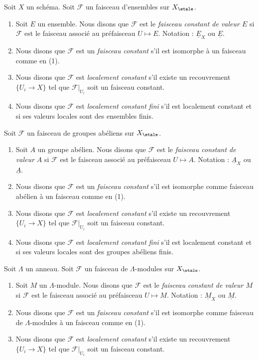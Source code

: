 \begin{definition}
\label{definition-finite-locally-constant}
Soit $X$ un sch\'ema.
Soit $\mathcal{F}$ un faisceau d'ensembles sur $X_\etale$.
\begin{enumerate}
\item Soit $E$ un ensemble. Nous disons que $\mathcal{F}$ est le
{\it faisceau constant de valeur $E$} si $\mathcal{F}$ est le
faisceau associ\'e au pr\'efaisceau $U \mapsto E$.
Notation : $\underline{E}_X$ ou $\underline{E}$.
\item Nous disons que $\mathcal{F}$ est un {\it faisceau constant} s'il est
isomorphe \`a un faisceau comme en (1).
\item Nous disons que $\mathcal{F}$ est {\it localement constant} s'il existe un
recouvrement $\{U_i \to X\}$ tel que $\mathcal{F}|_{U_i}$ soit un faisceau constant.
\item Nous disons que $\mathcal{F}$ est {\it localement constant fini} s'il
est localement constant et si ses valeurs locales sont des ensembles finis.
\end{enumerate}
Soit $\mathcal{F}$ un faisceau de groupes ab\'eliens sur $X_\etale$.
\begin{enumerate}
\item Soit $A$ un groupe ab\'elien.
Nous disons que $\mathcal{F}$ est le {\it faisceau constant de valeur $A$} si
$\mathcal{F}$ est le faisceau associ\'e au pr\'efaisceau $U \mapsto A$.
Notation : $\underline{A}_X$ ou $\underline{A}$.
\item Nous disons que $\mathcal{F}$ est un {\it faisceau constant} s'il est isomorphe
comme faisceau ab\'elien \`a un faisceau comme en (1).
\item Nous disons que $\mathcal{F}$ est {\it localement constant} s'il existe un
recouvrement $\{U_i \to X\}$ tel que $\mathcal{F}|_{U_i}$ soit un faisceau constant.
\item Nous disons que $\mathcal{F}$ est {\it localement constant fini} s'il
est localement constant et si ses valeurs locales sont des groupes ab\'eliens finis.
\end{enumerate}
Soit $\Lambda$ un anneau. Soit $\mathcal{F}$ un faisceau de $\Lambda$-modules
sur $X_\etale$.
\begin{enumerate}
\item Soit $M$ un $\Lambda$-module.
Nous disons que $\mathcal{F}$ est le {\it faisceau constant de valeur $M$} si
$\mathcal{F}$ est le faisceau associ\'e au pr\'efaisceau $U \mapsto M$.
Notation : $\underline{M}_X$ ou $\underline{M}$.
\item Nous disons que $\mathcal{F}$ est un {\it faisceau constant} s'il est isomorphe
comme faisceau de $\Lambda$-modules \`a un faisceau comme en (1).
\item Nous disons que $\mathcal{F}$ est {\it localement constant} s'il existe un
recouvrement $\{U_i \to X\}$ tel que $\mathcal{F}|_{U_i}$ soit un faisceau constant.
\end{enumerate}
\end{definition}

